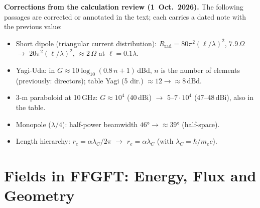 
\begin{tcolorbox}[colback=red!3!white,colframe=red!50!black,boxrule=0.8pt,title={Correction notes},fonttitle=\bfseries]
\textbf{Corrections from the calculation review (1~Oct.~2026).} The following passages are corrected or annotated in the text; each carries a dated note with the previous value:
\begin{itemize}
\item Short dipole (triangular current distribution): $R_\mathrm{rad}=80\pi^2(\ell/\lambda)^2$, $7.9\,\Omega$ $\to$ $20\pi^2(\ell/\lambda)^2$, $\approx2\,\Omega$ at $\ell=0.1\lambda$.
\item Yagi-Uda: in $G\approx10\log_{10}(0.8\,n+1)$\,dBd, $n$ is the number of elements (previously: directors); table Yagi (5 dir.) $\approx12\to\approx8\,\mathrm{dBd}$.
\item 3-m paraboloid at 10\,GHz: $G\approx10^4$ (40\,dBi) $\to$ $5$--$7\cdot10^4$ (47--48\,dBi), also in the table.
\item Monopole ($\lambda/4$): half-power beamwidth $46°\to\approx39°$ (half-space).
\item Length hierarchy: $r_e=\alpha\lambda_C/2\pi$ $\to$ $r_e=\alpha\lambda_C$ (with $\lambda_C=\hbar/m_ec$).
\end{itemize}
\end{tcolorbox}

\providecommand{\BM}{\textbf{[B]}}
\providecommand{\KM}{\textbf{[K]}}
\providecommand{\SM}{\textbf{[S]}}
\providecommand{\SetzM}{\textbf{[POSIT]}}
\providecommand{\QM}{\textbf{[Q]}}
\providecommand{\EM}{\textbf{[E]}}
\providecommand{\XM}{\textbf{[X]}}

\chapter*{Fields in FFGFT: Energy, Flux and Geometry}

